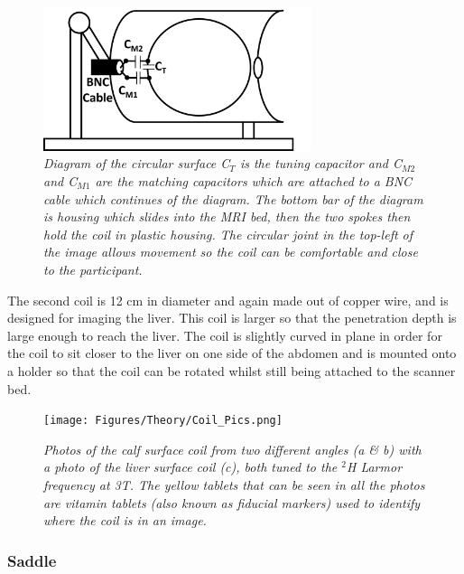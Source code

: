 \begin{figure}
    \centering
    \includegraphics[width=0.7\textwidth]{Figures/Theory/Liver_Coil.png}
    \caption{\textit{Diagram of the circular surface C$_T$ is the tuning capacitor and C$_{M2}$ and C$_{M1}$ are the matching capacitors which are attached to a BNC cable which continues of the diagram. The bottom bar of the diagram is housing which slides into the \ac{MRI} bed, then the two spokes then hold the coil in plastic housing. The circular joint in the top-left of the image allows movement so the coil can be comfortable and close to the participant.}}
    \label{fig:theory:Liver}
\end{figure}

The second coil is 12 cm in diameter and again made out of copper wire, and is designed for imaging the liver. This coil is larger so that the penetration depth is large enough to reach the liver. The coil is slightly curved in plane in order for the coil to sit closer to the liver on one side of the abdomen and is mounted onto a holder so that the coil can be rotated whilst still being attached to the scanner bed.

\begin{figure}
    \centering
    \texttt{[image: Figures/Theory/Coil\_Pics.png]}
    \caption{\textit{Photos of the calf surface coil from two different angles (a \& b) with a photo of the liver surface coil (c), both tuned to the $^2$H Larmor frequency at 3T. The yellow tablets that can be seen in all the photos are vitamin tablets (also known as fiducial markers) used to identify where the coil is in an image.}}
    \label{fig:theory:Pics}
\end{figure}

\subsubsection{Saddle}

